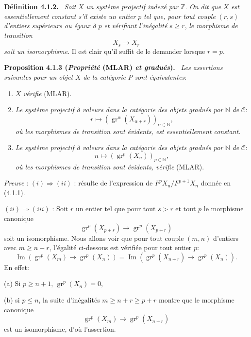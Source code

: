 \documentclass[11pt]{article}
\providecommand{\ZZ}{\mathbb{Z}}
\providecommand{\NN}{\mathbb{N}}
\newenvironment{statement}[1]{\par\medskip\noindent\textbf{#1.}\ }{\par\medskip}
\providecommand{\gr}{\operatorname{gr}}
\providecommand{\NN}{\mathbb N}
\providecommand{\cC}{\mathcal C}
\providecommand{\Im}{\operatorname{Im}}
\providecommand{\gr}{\operatorname{gr}}
\renewcommand{\Im}{\operatorname{Im}}
\providecommand{\gr}{\operatorname{gr}}
\providecommand{\Im}{\operatorname{Im}}
\providecommand{\cC}{\mathcal C}
\begin{document}
\begin{statement}{Définition 4.1.2}
\emph{Soit} $X$ \emph{un système projectif indexé par} $\ZZ$. \emph{On dit que} $X$ \emph{est essentiellement constant s'il existe un entier} $p$ \emph{tel que, pour tout couple} $(r,s)$ \emph{d'entiers supérieurs ou égaux à} $p$ \emph{et vérifiant l'inégalité} $s\ge r$, \emph{le morphisme de transition}
\[
X_s\longrightarrow X_r
\]
\emph{soit un isomorphisme}. Il est clair qu'il suffit de le demander lorsque $r=p$.
\end{statement}

\begin{statement}{Proposition 4.1.3 (\emph{Propriété} (MLAR) \emph{et gradués})}
\emph{Les assertions suivantes pour un objet} $X$ \emph{de la catégorie} $P$ \emph{sont équivalentes}:
\begin{enumerate}[label=(\roman*)]
\item $X$ \emph{vérifie} (MLAR).
\item \emph{Le système projectif à valeurs dans la catégorie des objets gradués par} $\NN$ \emph{de} $\cC$:
\[
r\longmapsto (\gr^\alpha(X_{\alpha+r}))_{\alpha\in\NN},
\]
\emph{où les morphismes de transition sont évidents, est essentiellement constant}.
\item \emph{Le système projectif à valeurs dans la catégorie des objets gradués par} $\NN$ \emph{de} $\cC$:
\[
n\longmapsto (\gr^p(X_n))_{p\in\NN},
\]
\emph{où les morphismes de transition sont évidents, vérifie} (MLAR).
\end{enumerate}
\end{statement}

\emph{Preuve} : $(i)\Rightarrow(ii)$ : résulte de l'expression de $F^pX_n/F^{p+1}X_n$ donnée en (4.1.1).

$(ii)\Rightarrow(iii)$ : Soit $r$ un entier tel que pour tout $s>r$ et tout $p$ le morphisme canonique
\[
\gr^p(X_{p+s})\longrightarrow \gr^p(X_{p+r})
\]
soit un isomorphisme. Nous allons voir que pour tout couple $(m,n)$ d'entiers avec $m\ge n+r$, l'égalité ci-dessous est vérifiée pour tout entier $p$:
\[
\Im(\gr^p(X_m)\to\gr^p(X_n))=
\Im(\gr^p(X_{n+r})\to\gr^p(X_n)).
\]
En effet:

(a) Si $p\ge n+1$, $\gr^p(X_n)=0$,

(b) si $p\le n$, la suite d'inégalités $m\ge n+r\ge p+r$ montre que le morphisme canonique
\[
\gr^p(X_m)\longrightarrow\gr^p(X_{n+r})
\]
est un isomorphisme, d'où l'assertion.
\end{document}
